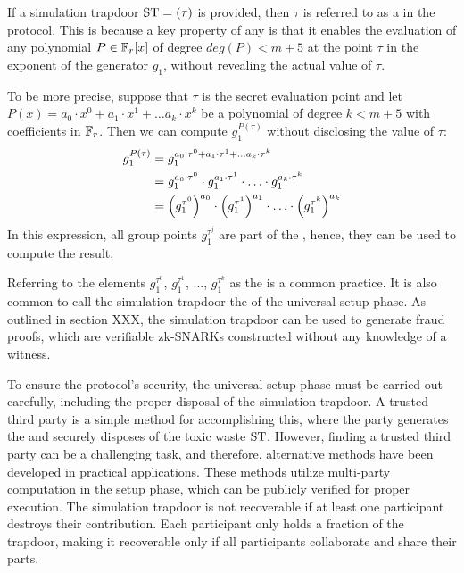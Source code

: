 If a simulation trapdoor $\mathrm{ST} = (\tau)$ is provided, then $\tau$ is referred to as a  in the protocol. This is because a key property of any  is that it enables the evaluation of any polynomial $P\in \mathbb{F}_r[x]$ of degree $deg(P)<m+5$ at the point $\tau$ in the exponent of the generator $g_1$, without revealing the actual value of $\tau$.

To be more precise, suppose that $\tau$ is the secret evaluation point and let $P(x)=a_0\cdot x^0 + a_1\cdot x^1 + \ldots a_k\cdot x^k$ be a polynomial of degree $k<m+5$ with coefficients in $\mathbb{F}_r$. Then we can compute $g_1^{P(\tau)}$ without disclosing the value of $\tau$:
\begin{align}
\label{eq:exp_evaluation-poly-plonk}
g_1^{P(\tau)} & = g_1^{a_0\cdot \tau^0 + a_1\cdot \tau^1 + \ldots a_k\cdot \tau^k} \notag\\
 & = g_1^{a_0\cdot \tau^0} \cdot g_1^{a_1\cdot \tau^1} \cdot \ldots \cdot g_1^{a_k\cdot \tau^k}\notag\\
 & = \Big(g_1^{\tau^0}\Big)^{a_0} \cdot \Big(g_1^{\tau^1}\Big)^{a_1} \cdot \ldots \cdot \Big(g_1^{\tau^k}\Big)^{a_k}
\end{align}
In this expression, all group points $g_1^{\tau^j}$ are part of the , hence, they can be used to compute the result.

Referring to the elements $g_{1}^{\tau^0}$, $g_{1}^{\tau^1}$, $\ldots$, $g_{1}^{\tau^k}$ as the  is a common practice. It is also common to call the simulation trapdoor the  of the universal setup phase. As outlined in section XXX, the simulation trapdoor can be used to generate fraud proofs, which are verifiable zk-SNARKs constructed without any knowledge of a witness.

To ensure the protocol's security, the universal setup phase must be carried out carefully, including the proper disposal of the simulation trapdoor. A trusted third party is a simple method for accomplishing this, where the party generates the  and securely disposes of the toxic waste $\mathrm{ST}$. However, finding a trusted third party can be a challenging task, and therefore, alternative methods have been developed in practical applications. These methods utilize multi-party computation in the setup phase, which can be publicly verified for proper execution. The simulation trapdoor is not recoverable if at least one participant destroys their contribution. Each participant only holds a fraction of the trapdoor, making it recoverable only if all participants collaborate and share their parts.

